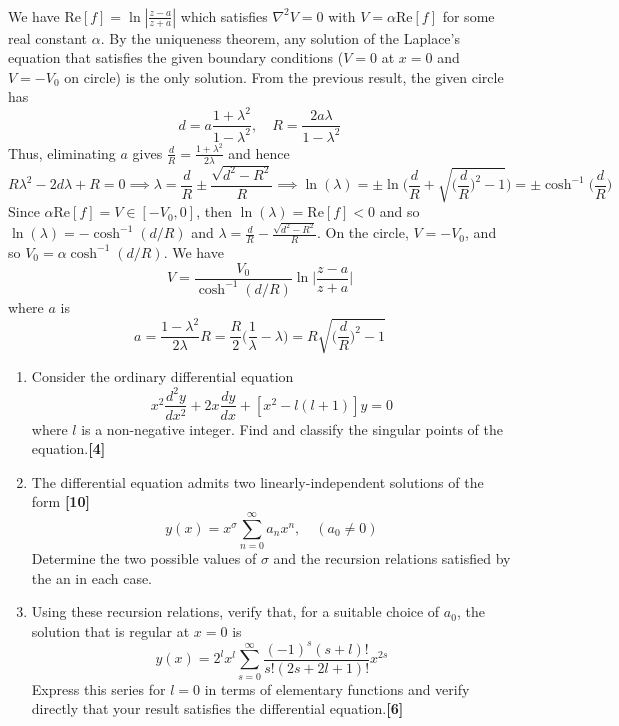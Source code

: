 \documentclass[a4paper]{article}
\begin{document}
\begin{ans}
\begin{enumerate}[label=(\roman*)]
\begin{align}
\end{align}
We have $\text{Re}[f]=\ln|\frac{z-a}{z+a}|$ which satisfies $\nabla^2V=0$ with $V=\alpha\text{Re}[f]$ for some real constant $\alpha$. By the uniqueness theorem, any solution of the Laplace's equation that satisfies the given boundary conditions ($V=0$ at $x=0$ and $V=-V_0$ on circle) is the only solution. From the previous result, the given circle has $$d=a\frac{1+\lambda^2}{1-\lambda^2},\quad R=\frac{2a\lambda}{1-\lambda^2}$$
Thus, eliminating $a$ gives $\frac{d}{R}=\frac{1+\lambda^2}{2\lambda}$ and hence
$$R\lambda^2-2d\lambda+R=0\implies\lambda=\frac{d}{R}\pm\frac{\sqrt{d^2-R^2}}{R}\implies\ln(\lambda)=\pm\ln\bigg(\frac{d}{R}+\sqrt{\bigg(\frac{d}{R}\bigg)^2-1}\bigg)=\pm\cosh^{-1}\bigg(\frac{d}{R}\bigg)$$
Since $\alpha\text{Re}[f]=V\in[-V_0,0]$, then $\ln(\lambda)=\text{Re}[f]<0$ and so $\ln(\lambda)=-\cosh^{-1}(d/R)$ and $\lambda=\frac{d}{R}-\frac{\sqrt{d^2-R^2}}{R}$. On the circle, $V=-V_0$, and so $V_0=\alpha\cosh^{-1}(d/R)$. We have
$$V=\frac{V_0}{\cosh^{-1}(d/R)}\ln\bigg|\frac{z-a}{z+a}\bigg|$$
where $a$ is
$$a=\frac{1-\lambda^2}{2\lambda}R=\frac{R}{2}\bigg(\frac{1}{\lambda}-\lambda\bigg)=R\sqrt{\bigg(\frac{d}{R}\bigg)^2-1}$$
\end{enumerate}
\end{ans}
\newpage
\begin{qns}\leavevmode
\begin{enumerate}[label=(\roman*)]
\item Consider the ordinary differential equation
$$x^2\frac{d^2y}{dx^2}+2x\frac{dy}{dx}+[x^2-l(l+1)]y=0$$
where $l$ is a non-negative integer. Find and classify the singular points of the equation.\hfill\textbf{[4]}
\item The differential equation admits two linearly-independent solutions of the form \hfill \textbf{[10]}
$$y(x)=x^\sigma\sum_{n=0}^\infty a_nx^n,\quad (a_0\neq 0)$$
Determine the two possible values of $\sigma$ and the recursion relations satisfied by the an in each case.
\item Using these recursion relations, verify that, for a suitable choice of $a_0$, the solution that is regular at $x = 0$ is
$$y(x)=2^lx^l\sum_{s=0}^\infty\frac{(-1)^s(s+l)!}{s!(2s+2l+1)!}x^{2s}$$
Express this series for $l = 0$ in terms of elementary functions and verify directly that your result satisfies the differential equation.\hfill \textbf{[6]}
\end{enumerate}
\end{qns}
\end{document}

